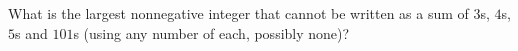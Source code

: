 What is the largest nonnegative integer that cannot be written as a sum of $3$s, $4$s, $5$s and $101$s (using any number of each, possibly none)?
